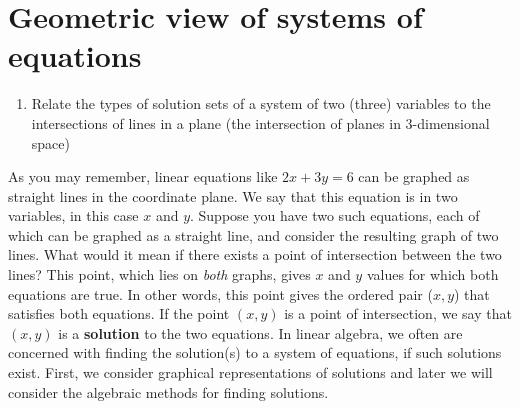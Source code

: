 \section{Geometric view of systems of equations}
\label{sec:systems-geometric}

\begin{outcome}
  \begin{enumerate}
  \item Relate the types of solution sets of a system of two (three)
    variables to the intersections of lines in a plane (the
    intersection of planes in $3$-dimensional space)
  \end{enumerate}
\end{outcome}

As you may remember, linear equations like $2x+3y=6$ can be graphed as
straight lines in the coordinate plane. We say that this equation is
in two variables, in this case $x$ and $y$.  Suppose you have two such
equations, each of which can be graphed as a straight line, and consider
the resulting graph of two lines. What would it mean if there exists a
point of intersection between the two lines? This point, which lies on
{\em both} graphs, gives $x$ and $y$ values for which both
equations are true. In other words, this point gives the ordered pair
($x,y$) that satisfies both equations.  If the point $(x, y
)$ is a point of intersection, we say that $(x, y)$
is a \textbf{solution} to the two equations. In linear algebra, we
often are concerned with finding the solution(s) to a system of
equations, if such solutions exist.  First, we consider graphical
representations of solutions and later we will consider the algebraic
methods for finding solutions.

